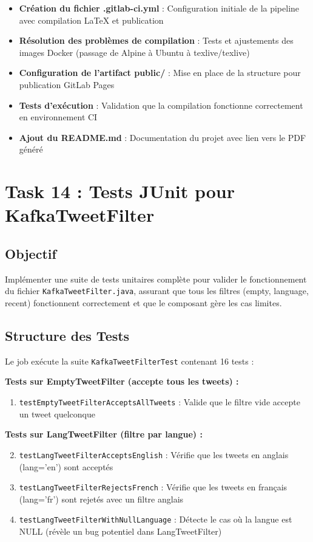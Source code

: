 \documentclass[10pt,a4paper]{article}
\begin{document}
\begin{itemize}
    \item \textbf{Création du fichier .gitlab-ci.yml} : Configuration initiale de la pipeline avec compilation LaTeX et publication
    \item \textbf{Résolution des problèmes de compilation} : Tests et ajustements des images Docker (passage de Alpine à Ubuntu à texlive/texlive)
    \item \textbf{Configuration de l'artifact public/} : Mise en place de la structure pour publication GitLab Pages
    \item \textbf{Tests d'exécution} : Validation que la compilation fonctionne correctement en environnement CI
    \item \textbf{Ajout du README.md} : Documentation du projet avec lien vers le PDF généré
\end{itemize}

\section{Task 14 : Tests JUnit pour KafkaTweetFilter}

\subsection{Objectif}

Implémenter une suite de tests unitaires complète pour valider le fonctionnement du fichier \texttt{KafkaTweetFilter.java}, assurant que tous les filtres (empty, language, recent) fonctionnent correctement et que le composant gère les cas limites.

\subsection{Structure des Tests}

Le job exécute la suite \texttt{KafkaTweetFilterTest} contenant 16 tests :

\textbf{Tests sur EmptyTweetFilter (accepte tous les tweets) :}
\begin{enumerate}
    \item \texttt{testEmptyTweetFilterAcceptsAllTweets} : Valide que le filtre vide accepte un tweet quelconque
\end{enumerate}

\textbf{Tests sur LangTweetFilter (filtre par langue) :}
\begin{enumerate}
    \setcounter{enumi}{1}
    \item \texttt{testLangTweetFilterAcceptsEnglish} : Vérifie que les tweets en anglais (lang='en') sont acceptés
    \item \texttt{testLangTweetFilterRejectsFrench} : Vérifie que les tweets en français (lang='fr') sont rejetés avec un filtre anglais
    \item \texttt{testLangTweetFilterWithNullLanguage} : Détecte le cas où la langue est NULL (révèle un bug potentiel dans LangTweetFilter)
\end{enumerate}
\end{document}
